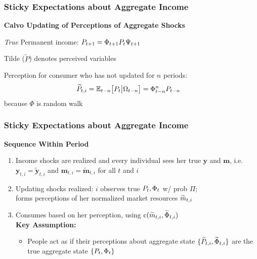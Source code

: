 \documentclass{beamer}\usepackage{dcolumn}
\newcommand{\jemph}[1]{{\color{StataDarkBlue}#1}}
\newcommand{\jbemph}[1]{\textbf{\color{SlideNavy}#1}}
\providecommand{\perc}[1]{\widetilde{#1}}
\providecommand{\jemph}[1]{{\color{jirkasblue}#1}}
\begin{document}
\begin{frame}
\frametitle{Sticky Expectations about Aggregate Income}

\jbemph{\large Calvo Updating of Perceptions of Aggregate Shocks}\\
\bi
\item {\it True} Permanent income: ${P}_{t+1} =  \Phi_{t+1} {P}_{t}\Psi_{t+1}$\\
\item Tilde ($\perc{P}$) denotes perceived variables
\item \jemph{Perception for consumer who has not updated for $n$ periods:}
$$
  \perc{P}_{t,i}=\Ex_{t-n}\big[P_t\big\vert\Omega_{t-n}\big]=\Phi_{t-n}^nP_{t-n}
$$
because $\Phi$ is random walk
\ei
\end{frame}



\begin{frame}
\frametitle{Sticky Expectations about Aggregate Income}

\jbemph{\large Sequence Within Period}\\
\begin{enumerate}
\setlength{\itemsep}{2mm}
\item Income shocks are realized and every individual sees her true $\mathbf{y}$ and $\mathbf{m}$,
i.e.\ $\mathbf{y}_{t,i}=\perc{\mathbf{y}}_{t,i}$ and $\mathbf{m}_{t,i}=\perc{\mathbf{m}}_{t,i}$ for all $t$ and $i$

\item Updating shocks realized: $i$ observes true $P_t, \Phi_t$ w/ prob $\Pi$;\\
forms perceptions of her normalized market resources $\perc{\mLev}_{t,i}$

\item Consumes based on her perception, \jemph{using $\cFunc(\perc{m}_{t,i},\perc{\PtyGro}_{t,i})$}\\[1mm]

  \jemph{\textbf{Key Assumption:}}\\
    \begin{itemize}
    \item  People act as if their perceptions about aggregate state $\{\perc{P}_{t,i},\perc{\PtyGro}_{t,i}\}$
are the true aggregate state $\{P_t,\Phi_t\}$
    \end{itemize}

\end{enumerate}

\end{frame}
\end{document}
